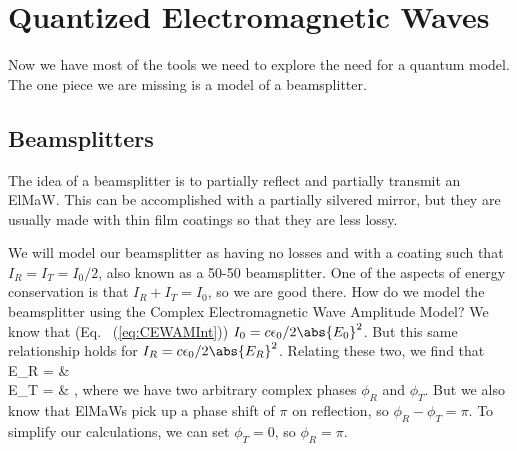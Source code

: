 \chapter{Quantized Electromagnetic Waves}
Now we have most of the tools we need to explore the need for a quantum model. The one piece we are missing is a model of a beamsplitter. 
\section{Beamsplitters}
\label{sec:EMbeamsplitter}
The idea of a beamsplitter is to partially reflect and partially transmit an ElMaW. This can be accomplished with a partially silvered mirror, but they are usually made with thin film coatings so that they are less lossy.
\begin{marginfigure}\centering
{}
\end{marginfigure}
We will model our beamsplitter as having no losses and with a coating such that $I_R = I_T = I_0/2$, also known as a 50-50 beamsplitter. One of the aspects of energy conservation is that $I_R + I_T = I_0$, so we are good there.
How do we model the beamsplitter using the Complex Electromagnetic Wave Amplitude Model? We know that (Eq.~ (\ref{eq:CEWAMInt})) $I_0 = c\epsilon_0/2\abs{E_0}^2$. But this same relationship holds for $I_R = c\epsilon_0/2\abs{E_R}^2$. Relating these two, we find that
\bas
E_R = & \;\;\\
E_T = & ,
\eas
where we have two arbitrary complex phases $\phi_R$ and $\phi_T$. But we also know that ElMaWs pick up a phase shift of $\pi$ on reflection, so $\phi_R - \phi_T = \pi$. To simplify our calculations, we can set $\phi_T=0$, so $\phi_R = \pi$.

